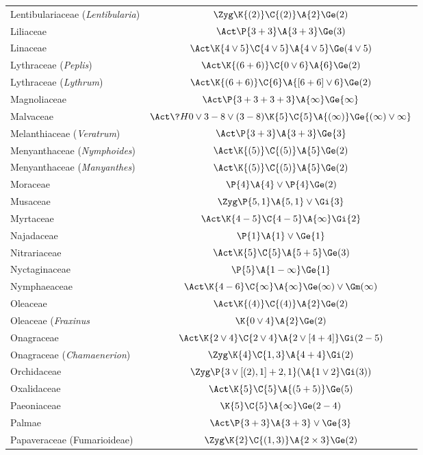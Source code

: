 \documentclass[12pt]{article}
\begin{document}
\begin{longtable}{lc}
Lentibulariaceae (\textit{Lentibularia}) & $\Zyg\K{(2)}\C{(2)}\A{2}\Ge(2)$\\[2pt]
Liliaceae & $\Act\P{3+3}\A{3+3}\Ge(3)$\\[2pt]
Linaceae & $\Act\K{4\vee5}\C{4\vee5}\A{4\vee5}\Ge(4\vee5)$\\[2pt]
Lythraceae (\textit{Peplis}) & $\Act\K{(6+6)}\C{0\vee6}\A{6}\Ge(2)$\\[2pt]
Lythraceae (\textit{Lythrum}) & $\Act\K{(6+6)}\C{6}\A{[6+6]\vee6}\Ge(2)$\\[2pt]
Magnoliaceae & $\Act\P{3+3+3+3}\A{\infty}\Ge{\infty}$\\[2pt]
Malvaceae & $\Act\?{H}{0\vee3-8\vee(3-8)}\K{5}\C{5}\A{(\infty)}\Ge{(\infty)\vee\infty}$\\[2pt]
Melanthiaceae (\textit{Veratrum}) & $\Act\P{3+3}\A{3+3}\Ge{3}$\\[2pt]
Menyanthaceae (\textit{Nymphoides}) & $\Act\K{(5)}\C{(5)}\A{5}\Ge(2)$\\[2pt]
Menyanthaceae (\textit{Manyanthes}) & $\Act\K{(5)}\C{(5)}\A{5}\Ge(2)$\\[2pt]
Moraceae & $\P{4}\A{4}\vee\P{4}\Ge(2)$\\[2pt]
Musaceae & $\Zyg\P{5,1}\A{5,1}\vee\Gi{3}$\\[2pt]
Myrtaceae & $\Act\K{4-5}\C{4-5}\A{\infty}\Gi{2}$\\[2pt]
Najadaceae & $\P{1}\A{1}\vee\Ge{1}$\\[2pt]
Nitrariaceae & $\Act\K{5}\C{5}\A{5+5}\Ge(3)$\\[2pt]
Nyctaginaceae  & $\P{5}\A{1-\infty}\Ge{1}$\\[2pt]
Nymphaeaceae & $\Act\K{4-6}\C{\infty}\A{\infty}\Ge(\infty)\vee\Gm(\infty)$\\[2pt]
Oleaceae & $\Act\K{(4)}\C{(4)}\A{2}\Ge(2)$\\[2pt]
Oleaceae (\textit{Fraxinus} & $\K{0\vee4}\A{2}\Ge(2)$\\[2pt]
Onagraceae & $\Act\K{2\vee4}\C{2\vee4}\A{2\vee[4+4]}\Gi(2-5)$\\[2pt]
Onagraceae (\textit{Chamaenerion}) & $\Zyg\K{4}\C{1,3}\A{4+4}\Gi(2)$\\[2pt]
Orchidaceae & $\Zyg\P{3\vee[(2),1]+2,1}(\A{1\vee2}\Gi(3))$\\[2pt]
Oxalidaceae & $\Act\K{5}\C{5}\A{(5+5)}\Ge(5)$\\[2pt]
Paeoniaceae & $\K{5}\C{5}\A{\infty}\Ge(2-4)$\\[2pt]
Palmae & $\Act\P{3+3}\A{3+3}\vee\Ge{3}$\\[2pt]
Papaveraceae (Fumarioideae) & $\Zyg\K{2}\C{(1,3)}\A{2\times3}\Ge(2)$\\[2pt]

\end{longtable}
\end{document}
